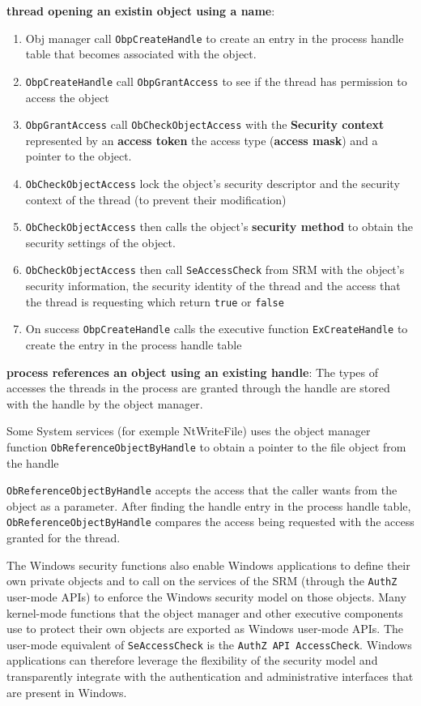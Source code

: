 {{\bf thread opening an existin object using a name}:
\begin{enumerate}
    \item Obj manager call \verb+ObpCreateHandle+ to create an entry in the process handle table that becomes associated with the object.
    \item \verb+ObpCreateHandle+ call \verb+ObpGrantAccess+ to see if the thread has permission to access the object
    \item \verb+ObpGrantAccess+ call \verb+ObCheckObjectAccess+ with the {\bf Security context} represented by an {\bf access token} the access type ({\bf access mask}) and a pointer to the object.
    \item \verb+ObCheckObjectAccess+ lock the object’s security descriptor and the security context of the thread (to prevent their modification)
    \item \verb+ObCheckObjectAccess+ then calls the object’s {\bf security method} to obtain the security settings of the object. 
    \item \verb+ObCheckObjectAccess+ then call \verb+SeAccessCheck+ from SRM with the object’s security information, the security identity of the thread and the access that the thread is requesting which return \verb+true+ or \verb+false+
    \item On success \verb+ObpCreateHandle+ calls the executive function \verb+ExCreateHandle+ to create the entry in the process handle table
\end{enumerate}


{\bf process references an object using an existing handle}:
The types of accesses the threads in the process are granted through the handle are stored with the handle by the object manager.

Some System services (for exemple NtWriteFile) uses the object manager function \verb+ObReferenceObjectByHandle+ to obtain a pointer to the file object from the handle


\verb+ObReferenceObjectByHandle+ accepts the access that the caller wants from the object as a parameter. After finding the handle entry in the process handle table, \verb+ObReferenceObjectByHandle+ compares the access being requested with the access granted for the thread.

The Windows security functions also enable Windows applications to define their own private objects and to call on the services of the SRM (through the \verb+AuthZ+ user-mode APIs) to enforce the Windows security model on those objects. Many kernel-mode functions that the object manager and other executive components use to protect their own objects are exported as Windows user-mode APIs. The user-mode equivalent of \verb+SeAccessCheck+ is the \verb+AuthZ API AccessCheck+. Windows applications can therefore leverage the flexibility of the security model and transparently integrate with the authentication and administrative interfaces that are present in Windows.

}
